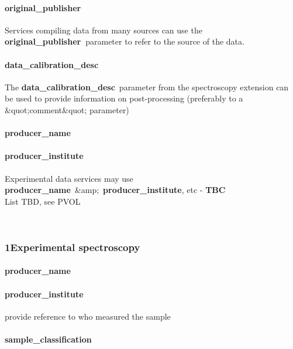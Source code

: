 \documentclass[11pt,a4paper]{ivoa}
\begin{document}
\paragraph{original\_publisher}

Services compiling data from many sources can use the \textbf{original\_publisher }parameter to refer to the source of the data.

\paragraph{data\_calibration\_desc}

The\textbf{ }\textbf{data\_calibration\_desc} parameter from the spectroscopy extension can be used to provide information on post-processing (preferably to a \&quot;comment\&quot; parameter)

\paragraph{producer\_name}

\paragraph{producer\_institute\\}

Experimental data services may use \textbf{producer\_name} \&amp; \textbf{producer\_institute}, etc - \textbf{TBC}\\List TBD, see PVOL 

\\

\subsubsection{1Experimental spectroscopy\\}

\paragraph{producer\_name}

\paragraph{producer\_institute}

provide reference to who measured the sample

\paragraph{sample\_classification}
\end{document}
